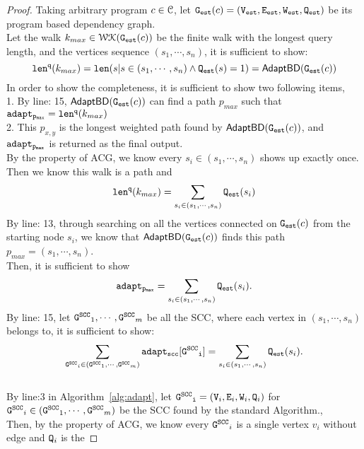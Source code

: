 \begin{proof}
  Taking arbitrary program $c \in \mathcal{C}$, let $\mathtt{{G_{est}}}(c) = (\mathtt{{V_{est}}}, \mathtt{{E_{est}}}, \mathtt{{W_{est}}}, \mathtt{{Q_{est}}})$ be its 
  program based dependency graph.
  \\
  Let the walk $k_{max} \in \mathcal{WK}{(\mathtt{{G_{est}}}(c))}$ be the finite walk with the longest query length, and the vertices sequence
  $(s_1, \cdots, s_n)$, 
  it is sufficient to show:
  \[
    \mathtt{len}^{\tt q}(k_{max}) = \mathtt{len}(s | s \in (s_1, \cdots, s_n) \land \mathtt{{Q_{est}}}(s) = 1) = \mathsf{AdaptBD}(\mathtt{{G_{est}}}(c))
  \]
  In order to show the completeness, it is sufficient to show two following items,
  \\
  1. By line: 15, $\mathsf{AdaptBD}(\mathtt{{G_{est}}}(c))$ can find a path $p_{max}$ such that $\mathtt{adapt_{p_{max}}} = \mathtt{len}^{\tt q}(k_{max})$ 
  \\
  2. This $p_{x,y}$ is the longest weighted path found by $\mathsf{AdaptBD}(\mathtt{{G_{est}}}(c))$, and $\mathtt{adapt_{p_{max}}}$ is returned as the final output.
  \\
  By the property of ACG, we know
  every $s_i \in (s_1, \cdots, s_n)$ shows up exactly once. 
  Then we know this walk is a path and
  \[
    \mathtt{len}^{\tt q}(k_{max}) = \sum_{s_i \in (s_1, \cdots, s_n)} \mathtt{{Q_{est}}}(s_i)
  \]
  By line: 13, through searching on all the vertices connected on $\mathtt{{G_{est}}}(c)$ from the starting node $s_i$,
  we know that $\mathsf{AdaptBD}(\mathtt{{G_{est}}}(c))$ finds this path $p_{max} = (s_1, \cdots, s_n)$.
  \\
  Then, it is sufficient to show 
  $$
  \mathtt{adapt_{p_{max}}} = \sum_{s_i \in (s_1, \cdots, s_n)} \mathtt{{Q_{est}}}(s_i).
  $$
  By line: 15, let $\mathtt{G^{SCC}}_1, \cdots, \mathtt{G^{SCC}}_m$ be all the SCC, where each vertex in 
  $(s_1, \cdots, s_n) $ belongs to, it is sufficient to show:
  \[
    \sum_{\mathtt{G^{SCC}}_i \in (\mathtt{G^{SCC}}_1, \cdots, \mathtt{G^{SCC}}_m)} \mathtt{adapt_{scc}[\mathtt{G^{SCC}}_i]} 
    = \sum_{s_i \in (s_1, \cdots, s_n)} \mathtt{{Q_{est}}}(s_i).
    \]
  \\
  By line:3 in Algorithm~\ref{alg:adapt}, 
  let $\mathtt{\mathtt{G^{SCC}}_i} = (\mathtt{V}_i, \mathtt{E}_i, \mathtt{W}_i, \mathtt{Q}_i)$ for $\mathtt{G^{SCC}}_i \in (\mathtt{G^{SCC}}_1, \cdots, \mathtt{G^{SCC}}_m)$
  be the SCC found by the standard Algorithm.,
  \\
  Then, by the property of ACG, we know every $\mathtt{G^{SCC}}_i$ is a single vertex $v_i$ without edge and $\mathtt{Q}_i$ is the 

\end{proof}
